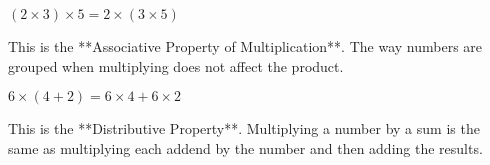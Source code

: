 \documentclass{ximera}
\begin{document}
\begin{problem}
$(2 \times 3) \times 5 = 2 \times (3 \times 5)$

\begin{feedback}
This is the **Associative Property of Multiplication**. The way numbers are grouped when multiplying does not affect the product.
\end{feedback}
\end{problem}

\begin{problem}
$6 \times (4 + 2) = 6 \times 4 + 6 \times 2$

\begin{feedback}
This is the **Distributive Property**. Multiplying a number by a sum is the same as multiplying each addend by the number and then adding the results.
\end{feedback}
\end{problem}
\end{document}
